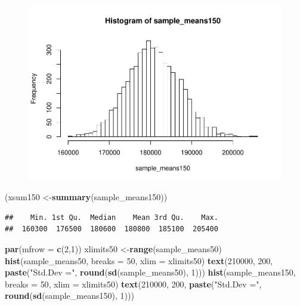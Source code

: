 \documentclass[]{article}
\newenvironment{Shaded}{\begin{snugshade}}{\end{snugshade}}
\newcommand{\KeywordTok}[1]{\textcolor[rgb]{0.13,0.29,0.53}{\textbf{{#1}}}}
\newcommand{\DataTypeTok}[1]{\textcolor[rgb]{0.13,0.29,0.53}{{#1}}}
\newcommand{\DecValTok}[1]{\textcolor[rgb]{0.00,0.00,0.81}{{#1}}}
\newcommand{\StringTok}[1]{\textcolor[rgb]{0.31,0.60,0.02}{{#1}}}
\newcommand{\NormalTok}[1]{{#1}}
\begin{document}
\begin{figure}[htbp]
\centering
\includegraphics{Lab3A_files/figure-latex/CreateSampleMeans150DistPrice-1.pdf}
\caption{}
\end{figure}

\begin{Shaded}
\begin{Highlighting}[]
\NormalTok{(xsum150 <-}\KeywordTok{summary}\NormalTok{(sample_means150))}
\end{Highlighting}
\end{Shaded}

\begin{verbatim}
##    Min. 1st Qu.  Median    Mean 3rd Qu.    Max. 
##  160300  176500  180600  180800  185100  205400
\end{verbatim}

\begin{Shaded}
\begin{Highlighting}[]
\KeywordTok{par}\NormalTok{(}\DataTypeTok{mfrow =} \KeywordTok{c}\NormalTok{(}\DecValTok{2}\NormalTok{,}\DecValTok{1}\NormalTok{))}
\NormalTok{xlimits50 <-}\KeywordTok{range}\NormalTok{(sample_means50)}
\KeywordTok{hist}\NormalTok{(sample_means50, }\DataTypeTok{breaks =} \DecValTok{50}\NormalTok{, }\DataTypeTok{xlim =} \NormalTok{xlimits50)}
\KeywordTok{text}\NormalTok{(}\DecValTok{210000}\NormalTok{, }\DecValTok{200}\NormalTok{, }\KeywordTok{paste}\NormalTok{(}\StringTok{"Std.Dev ="}\NormalTok{, }\KeywordTok{round}\NormalTok{(}\KeywordTok{sd}\NormalTok{(sample_means50), }\DecValTok{1}\NormalTok{)))}
\KeywordTok{hist}\NormalTok{(sample_means150, }\DataTypeTok{breaks =} \DecValTok{50}\NormalTok{, }\DataTypeTok{xlim =} \NormalTok{xlimits50)}
\KeywordTok{text}\NormalTok{(}\DecValTok{210000}\NormalTok{, }\DecValTok{200}\NormalTok{, }\KeywordTok{paste}\NormalTok{(}\StringTok{"Std.Dev ="}\NormalTok{, }\KeywordTok{round}\NormalTok{(}\KeywordTok{sd}\NormalTok{(sample_means150), }\DecValTok{1}\NormalTok{)))}
\end{Highlighting}
\end{Shaded}
\end{document}
